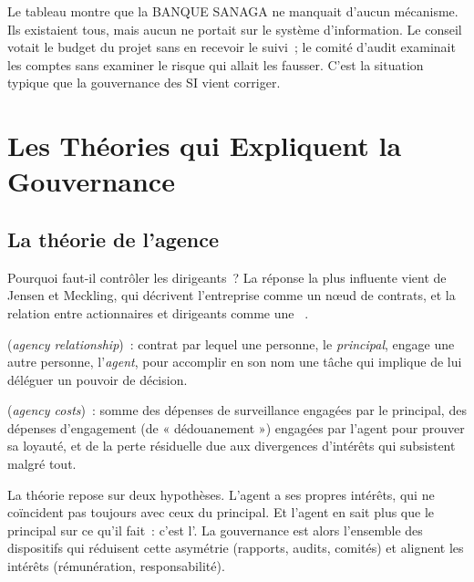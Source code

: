 Le tableau montre que la BANQUE SANAGA ne manquait d'aucun mécanisme. Ils
existaient tous, mais aucun ne portait sur le système d'information. Le
conseil votait le budget du projet sans en recevoir le suivi~; le comité
d'audit examinait les comptes sans examiner le risque qui allait les
fausser. C'est la situation typique que la gouvernance des SI vient
corriger.

\section{Les Théories qui Expliquent la Gouvernance}
\label{sec:c01-theories}

\subsection{La théorie de l'agence}

Pourquoi faut-il contrôler les dirigeants~? La réponse la plus influente
vient de Jensen et Meckling, qui décrivent l'entreprise comme un nœud de
contrats, et la relation entre actionnaires et dirigeants comme une
~\cite{jensen1976agency}.

\begin{boxdef}
 (\textit{agency
relationship})~: contrat par lequel une personne, le \emph{principal},
engage une autre personne, l'\emph{agent}, pour accomplir en son nom une
tâche qui implique de lui déléguer un pouvoir de décision.

\medskip
{} (\textit{agency costs})~:
somme des dépenses de surveillance engagées par le principal, des dépenses
d'engagement (de « dédouanement ») engagées par l'agent pour prouver sa
loyauté, et de la perte résiduelle due aux divergences d'intérêts qui
subsistent malgré tout.
\end{boxdef}

La théorie repose sur deux hypothèses. L'agent a ses propres intérêts, qui
ne coïncident pas toujours avec ceux du principal. Et l'agent en sait plus
que le principal sur ce qu'il fait~: c'est l'. La gouvernance est alors
l'ensemble des dispositifs qui réduisent cette asymétrie (rapports,
audits, comités) et alignent les intérêts (rémunération, responsabilité).

